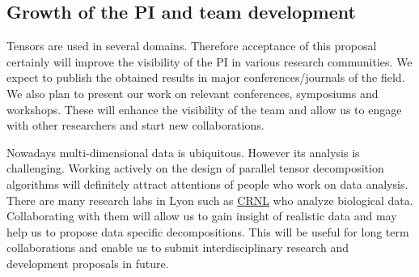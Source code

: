 \documentclass[a4paper,11pt]{article}
\begin{document}
%	
%	
	
	\subsection{Growth of the PI and team development}
	\label{sec:org:growth}
	Tensors are used in several domains. Therefore acceptance of this proposal certainly will improve the visibility of the PI in various research communities. We expect to publish the obtained results in major conferences/journals of the field. We also plan to present our work on relevant conferences, symposiums and workshops. These will enhance the visibility of the team and allow us to engage with other researchers and start new collaborations.

	
	
	
	Nowadays multi-dimensional data is ubiquitous. However its analysis is challenging. Working actively on the design of parallel tensor decomposition algorithms will definitely attract attentions of people who work on data analysis. There are many research labs in Lyon such as \href{https://www.crnl.fr/}{CRNL} who analyze biological data. Collaborating with them will allow us to gain insight of realistic data and may help us to propose data specific decompositions. This will be useful for long term collaborations and enable us to submit interdisciplinary research and development proposals in future.
	
\end{document}
